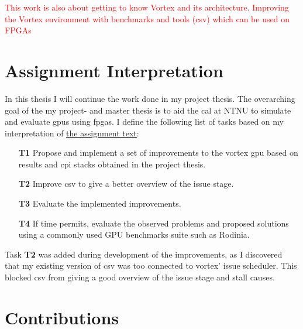 \textcolor{red}{This work is also about getting to know Vortex and its architecture. Improving the Vortex environment with benchmarks and tools (\acrshort{csv}) which can be used on FPGAs}

\section{Assignment Interpretation}

In this thesis I will continue the work done in my project thesis\cite{Aurud_Project}. The overarching goal of the my project- and master thesis is to aid the \acrfull{cal} at NTNU to simulate and evaluate \acrshort{gpu}s using \acrshort{fpga}s. I define the following list of tasks based on my interpretation of \hyperref[chap:assignment]{the assignment text}:

\begin{itemize}
    \item[\textbf{T1}] Propose and implement a set of improvements to the \Gls{vortex} \acrshort{gpu} based on results and \acrshort{cpi} stacks obtained in the project thesis.
    \item[\textbf{T2}] Improve \acrshort{csv} to give a better overview of the issue stage. 
    \item[\textbf{T3}] Evaluate the implemented improvements.
    \item[\textbf{T4}] If time permits, evaluate the observed problems and proposed solutions using a commonly used GPU benchmarks suite such as Rodinia.
\end{itemize}

Task \textbf{T2} was added during development of the improvements, as I discovered that my existing version of \acrshort{csv} was too connected to \Gls{vortex}' issue scheduler. This blocked \acrshort{csv} from giving a good overview of the issue stage and stall causes.

\section{Contributions}

